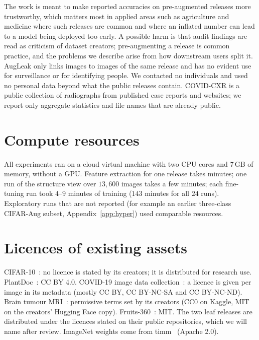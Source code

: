 The work is meant to make reported accuracies on pre-augmented releases more trustworthy, which matters most in applied areas such as agriculture and medicine where such releases are common and where an inflated number can lead to a model being deployed too early. A possible harm is that audit findings are read as criticism of dataset creators; pre-augmenting a release is common practice, and the problems we describe arise from how downstream users split it. AugLeak only links images to images of the same release and has no evident use for surveillance or for identifying people. We contacted no individuals and used no personal data beyond what the public releases contain. COVID-CXR is a public collection of radiographs from published case reports and websites; we report only aggregate statistics and file names that are already public.

\section{Compute resources}
\label{app:compute}

All experiments ran on a cloud virtual machine with two CPU cores and 7\,GB of memory, without a GPU. Feature extraction for one release takes minutes; one run of the structure view over $13{,}600$ images takes a few minutes; each fine-tuning run took $4$--$9$ minutes of training ($143$ minutes for all $24$ runs). Exploratory runs that are not reported (for example an earlier three-class CIFAR-Aug subset, Appendix~\ref{app:hyper}) used comparable resources.

\section{Licences of existing assets}
\label{app:licences}

CIFAR-10~\citep{krizhevsky2009cifar}: no licence is stated by its creators; it is distributed for research use. PlantDoc~\citep{singh2020plantdoc}: CC BY 4.0. COVID-19 image data collection~\citep{cohen2020covid}: a licence is given per image in its metadata (mostly CC BY, CC BY-NC-SA and CC BY-NC-ND). Brain tumour MRI~\citep{bhuvaji2020brain}: permissive terms set by its creators (CC0 on Kaggle, MIT on the creators' Hugging Face copy). Fruits-360~\citep{muresan2018fruits}: MIT. The two leaf releases are distributed under the licences stated on their public repositories, which we will name after review. ImageNet weights come from timm~\citep{wightman2019timm} (Apache 2.0).

